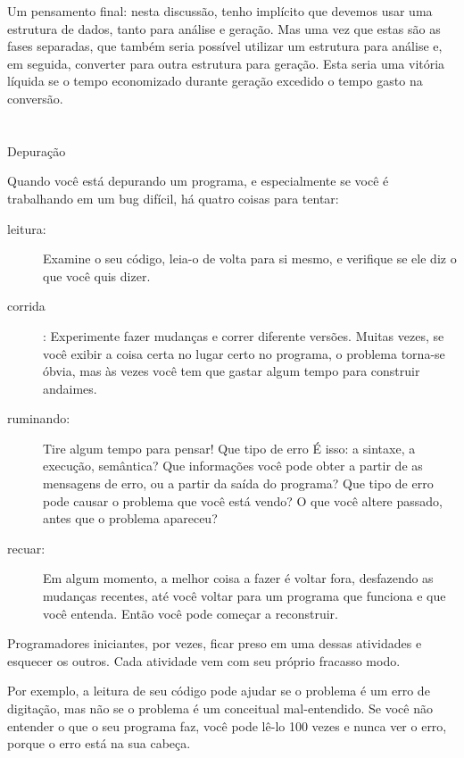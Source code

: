 \documentclass[10pt]{book}
\begin{document}
\begin{v erbatim}
{Um pensamento final: nesta discussão, tenho implícito que
devemos usar uma estrutura de dados, tanto para análise e geração. Mas
uma vez que estas são as fases separadas, que também seria possível utilizar um
estrutura para análise e, em seguida, converter para outra estrutura para
geração. Esta seria uma vitória líquida se o tempo economizado durante
geração excedido o tempo gasto na conversão.


\section{} Depuração

Quando você está depurando um programa, e especialmente se você é
trabalhando em um bug difícil, há quatro coisas para tentar:

\begin{description}

\item[leitura:] Examine o seu código, leia-o de volta para si mesmo, e
verifique se ele diz o que você quis dizer.

\item[corrida]: Experimente fazer mudanças e correr diferente
versões. Muitas vezes, se você exibir a coisa certa no lugar certo
no programa, o problema torna-se óbvia, mas às vezes você tem que
gastar algum tempo para construir andaimes.

\item[ruminando:] Tire algum tempo para pensar! Que tipo de erro
É isso: a sintaxe, a execução, semântica? Que informações você pode obter a partir de
as mensagens de erro, ou a partir da saída do programa? Que tipo de
erro pode causar o problema que você está vendo? O que você altere
passado, antes que o problema apareceu?

\item[recuar:] Em algum momento, a melhor coisa a fazer é voltar
fora, desfazendo as mudanças recentes, até você voltar para um programa que
funciona e que você entenda. Então você pode começar a reconstruir.

\end{description}

Programadores iniciantes, por vezes, ficar preso em uma dessas atividades
e esquecer os outros. Cada atividade vem com seu próprio fracasso
modo.

Por exemplo, a leitura de seu código pode ajudar se o problema é um
erro de digitação, mas não se o problema é um conceitual
mal-entendido. Se você não entender o que o seu programa faz, você
pode lê-lo 100 vezes e nunca ver o erro, porque o erro está na
sua cabeça.

}
\end{v erbatim}
\end{document}
